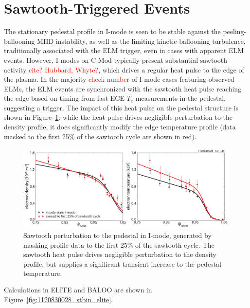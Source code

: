 \documentclass[12pt,floatfix,showpacs]{revtex4-1}
\newcommand{\note}[1]{\textcolor{red}{#1}}
\begin{document}
\section{Sawtooth-Triggered Events}\label{sec:sawtooth}

The stationary pedestal profile in I-mode is seen to be stable against the peeling-ballooning MHD instability, as well as the limiting kinetic-ballooning turbulence, traditionally associated with the ELM trigger, even in cases with apparent ELM events.
However, I-modes on C-Mod typically present substantial sawtooth activity \note{cite? Hubbard, Whyte?}, which drives a regular heat pulse to the edge of the plasma.
In the majority \note{check number} of I-mode cases featuring observed ELMs, the ELM events are synchronized with the sawtooth heat pulse reaching the edge based on timing from fast ECE $T_e$ measurements in the pedestal, suggesting a trigger.
The impact of this heat pulse on the pedestal structure is shown in Figure~\ref{fig:prof_stbin}: while the heat pulse drives negligible perturbation to the density profile, it does significantly modify the edge temperature profile (data masked to the first 25\% of the sawtooth cycle are shown in red).

\begin{figure}[htp]
 \includegraphics[width=\textwidth]{pdfgraphics/1120830028_prof_stbin.pdf}
 \caption{Sawtooth perturbation to the pedestal in I-mode, generated by masking profile data to the first 25\% of the sawtooth cycle.  The sawtooth heat pulse drives negligible perturbation to the density profile, but supplies a significant transient increase to the pedestal temperature.}
 \label{fig:prof_stbin}
\end{figure}

Calculations in ELITE and BALOO are shown in Figure~\ref{fig:1120830028_stbin_elite}.
\end{document}
